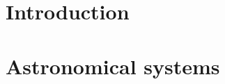 \documentclass[a4paper, 11pt, titlepage, twoside]{book}
\def\today{\number\day\space\ifcase\month\or January\or February\or March\or April\or May\or June\or July\or August\or September\or October\or November\or December\fi\space\number\year}
\begin{document}
\author{{\LARGE{}Christopher P.\ L.\ Berry}\vspace{2mm}\\
Churchill College and Institute of Astronomy\\
\vspace{1mm}}

\date{\texttt{[image: ../UC-shield/uc-shield-black.eps]}\vspace{14mm}
\\{This dissertation is submitted for the degree of}\vspace{1mm}\\{\sc\LARGE{}Doctor of Philosophy}\vspace{3mm}
\\{\Large{}Supervisor: Jonathan R.\ Gair}\vspace{11mm}
\\{\Large\today}}

\maketitle
{}









\tableofcontents

\mainmatter

\part{Introduction}



\part{Astronomical systems}\label{pt:astro}










\end{document}
